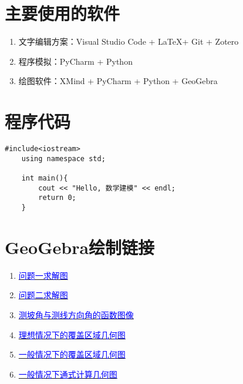 


\nocite{*}


\appendix
\section{主要使用的软件}

\begin{enumerate}
    \item 文字编辑方案：Visual Studio Code + \LaTeX + Git + Zotero
    \item 程序模拟：PyCharm + Python
    \item 绘图软件：XMind + PyCharm + Python + GeoGebra
\end{enumerate}

\section{程序代码}

\begin{lstlisting}[caption={类的定义语句}]
    #include<iostream>
    using namespace std;

    int main(){
        cout << "Hello, 数学建模" << endl;
        return 0;
    }
\end{lstlisting}

\section{GeoGebra绘制链接}

\begin{enumerate}
    \item \href{https://www.geogebra.org/m/hpkkarys}{\textcolor{blue}{问题一求解图}}
    \item \href{https://www.geogebra.org/m/f6kfjvru}{\textcolor{blue}{问题二求解图}}
    \item \href{https://www.geogebra.org/m/n8saurfn}{\textcolor{blue}{测坡角与测线方向角的函数图像}}
    \item \href{https://www.geogebra.org/m/xcvstdzg}{\textcolor{blue}{理想情况下的覆盖区域几何图}}
    \item \href{https://www.geogebra.org/m/absuxwpk}{\textcolor{blue}{一般情况下的覆盖区域几何图}}
    \item \href{https://www.geogebra.org/m/jzwhwcqr}{\textcolor{blue}{一般情况下通式计算几何图}}
\end{enumerate}
